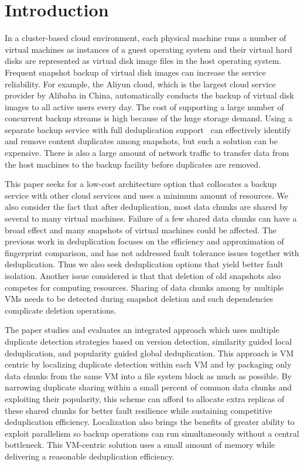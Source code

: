 \section{Introduction}
In a cluster-based cloud environment,
each physical machine runs a number  of virtual machines as  instances of a guest operating system 
and their  virtual hard disks are represented as virtual disk image files in the host operating system.
Frequent  snapshot backup of virtual disk images  can increase  the service reliability. 
For example, the Aliyun cloud, which is  the largest cloud service provider by Alibaba in China, 
automatically conducts  the backup of virtual disk images to all active users every day.
The cost of supporting a large number of concurrent backup streams is high
because of the huge storage demand. 
Using a separate  backup service with full deduplication support~\cite{venti02,bottleneck08}
can effectively identify and remove content duplicates among snapshots, 
but such a solution can be expensive. There is also a large amount of 
network traffic to transfer  data from the host machines to the backup facility
before duplicates are removed.

This paper seeks for a low-cost architecture option  that collocates
a backup service with other cloud services and  uses a minimum amount of resources. 
We also consider the fact that after
deduplication, most data chunks are shared by several to many virtual machines.
Failure of a few shared data chunks can have a 
broad effect and many
snapshots of virtual machines could be affected.
The previous work in deduplication focuses on the efficiency and approximation of
fingerprint comparison, and has not addressed fault tolerance issues  together with deduplication.
Thus we also seek deduplication options that yield better fault isolation.
Another issue considered is that
that deletion of old snapshots also competes for computing resources. 
Sharing of data chunks among by multiple VMs needs to be detected during
snapshot   deletion and such dependencies complicate deletion operations. 

The paper studies and evaluates  an integrated approach which uses  multiple duplicate detection strategies
based on  version  detection, similarity guided local deduplication,
and popularity guided global deduplication. 
This approach is VM centric by localizing duplicate detection within each VM  
and by packaging only data chunks from the same VM into a file system block as much as possible.
By narrowing duplicate sharing within a small percent of common data chunks and exploiting their popularity,
this scheme can afford to allocate extra replicas of these shared chunks for better
fault resilience while sustaining competitive deduplication efficiency.
Localization also brings the benefits of greater ability to exploit parallelism so
backup operations can run simultaneously without a central  bottleneck.
This  VM-centric solution uses  a small amount of  memory while delivering a reasonable deduplication efficiency. 

